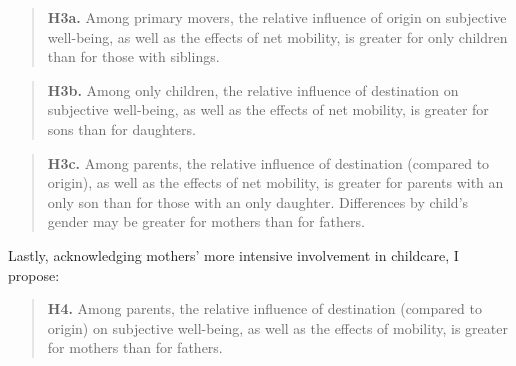 \begin{quote}
    \textbf{H3a.} Among primary movers, the relative influence of origin on subjective well-being, as well as the effects of net mobility, is greater for only children than for those with siblings.
\end{quote}

\begin{quote}
    \textbf{H3b.} Among only children, the relative influence of destination on subjective well-being, as well as the effects of net mobility, is greater for sons than for daughters.
\end{quote}

\begin{quote}
    \textbf{H3c.} Among parents, the relative influence of destination (compared to origin), as well as the effects of net mobility, is greater for parents with an only son than for those with an only daughter. Differences by child's gender may be greater for mothers than for fathers.
\end{quote}

Lastly, acknowledging mothers' more intensive involvement in childcare, I propose:

\begin{quote}
    \textbf{H4.} Among parents, the relative influence of destination (compared to origin) on subjective well-being, as well as the effects of mobility, is greater for mothers than for fathers.
\end{quote}
